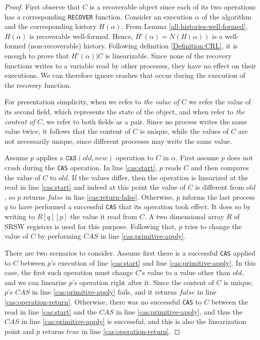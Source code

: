 \begin{proof}
	
	First observe that $C$ is a recoverable object since each of its two operations has a corresponding \texttt{RECOVER} function. Consider an execution $\alpha$ of the algorithm and the corresponding history $H(\alpha)$. From Lemma \ref{all-histories-well-formed}, $H(\alpha)$ is recoverable well-formed. Hence, $H'(\alpha)=N(H(\alpha))$ is a well-formed (non-recoverable) history. Following definition \ref{Definition:CRL}, it is enough to prove that $H'(\alpha) | C$ is  linearizable.
	Since none of the recovery functions writes to a variable read by other processes, they have no effect on their executions. We can therefore ignore crashes that occur during the execution of the recovery function.
	
	For presentation simplicity, when we refer to \emph{the value of} $C$ we refer the value of its second field, which represents the state of the object, and when refer to \emph{the content of }$C$, we refer to both fields as a pair. Since no process writes the same value twice, it follows that the content of $C$ is unique, while the values of $C$ are not necessarily unique, since different processes may write the same value.
	
	Assume $p$ applies a $\texttt{CAS}(old,new)$ operation to $C$ in $\alpha$. First assume $p$ does not crash during the \texttt{CAS} operation.
	In line \ref{cas:start}, $p$ reads $C$ and then compares the value of $C$ to $old$. If the values differ, then the operation is linearized at the read in line \ref{cas:start} and indeed at this point the value of $C$ is different from $old$, so $p$ returns $false$ in line \ref{cas:return-false}.
	Otherwise, $p$ informs the last process $q$ to have performed a successful \texttt{CAS} that its operation took effect. It does so by writing to $R[q][p]$ the value it read from $C$. A two dimensional array $R$ of SRSW registers is used for this purpose. Following that, $p$ tries to change the value of $C$ by performing $CAS$ in line \ref{cas:primitive-apply}. %
	
	There are two scenarios to consider.
	Assume first there is a successful \texttt{CAS} applied to $C$ between $p$'s execution of line \ref{cas:start} and line \ref{cas:primitive-apply}. In this case, the first such operation must change $C$'s value to a value other than $old$, and we can linearize $p$'s operation right after it. Since the content of $C$ is unique, $p$'s $CAS$ in line \ref{cas:primitive-apply} fails, and it returns $false$ in line \ref{cas:operation-return}. Otherwise, there was no successful \texttt{CAS} to $C$ between the read in line \ref{cas:start} and the $CAS$ in line \ref{cas:primitive-apply}, and thus the $CAS$ in line \ref{cas:primitive-apply} is successful, and this is also the linearization point and $p$ returns $true$ in line \ref{cas:operation-return}.
	

\end{proof}
